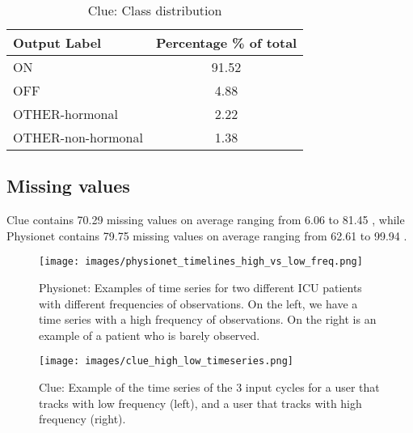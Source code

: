 \documentclass{article}
\begin{document}
\vspace{1cm}

\begin{table}[h]
\caption{\label{tab:clue_class_imbalance} Clue: Class distribution}
\vskip 0.15in
\begin{center}
\begin{sc}
\begin{tabular}{lc}
\toprule
Output Label & Percentage \% of total \\
\midrule
ON &  91.52 \\
OFF &  4.88 \\
OTHER-hormonal & 2.22 \\
OTHER-non-hormonal & 1.38 \\
\bottomrule
\end{tabular}
\end{sc}
\end{center}
\vskip -0.3in
\end{table} 

\newpage
\subsection{\large Missing values}
Clue contains 70.29  missing values on average ranging from 6.06  to 81.45 , while Physionet contains 79.75  missing values on average ranging from 62.61  to 99.94 . 

\begin{figure}[h]
\vskip 0.2in
\begin{center}
\centerline{\texttt{[image: images/physionet\_timelines\_high\_vs\_low\_freq.png]}}
\caption{Physionet: Examples of time series for two different ICU patients with different frequencies of observations. On the left, we have a time series with a high frequency of observations. On the right is an example of a patient who is barely observed.} 
\label{physio_high_low_missing}
\end{center}
\end{figure}

\begin{figure}[h]
\vskip 0.2in
\begin{center}
\centerline{\texttt{[image: images/clue\_high\_low\_timeseries.png]}}
\caption{Clue: Example of the time series of the 3 input cycles for a user that tracks with low frequency (left), and a user that tracks with high frequency (right).} 
\label{clue_high_low_missing}
\end{center}
\end{figure}
\end{document}
